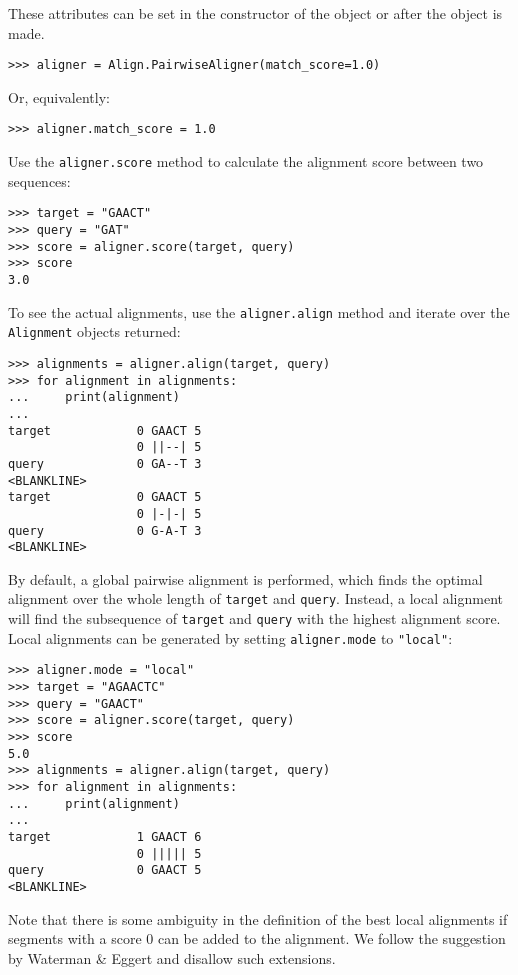 These attributes can be set in the constructor of the object or after the object
is made.

\begin{verbatim}
>>> aligner = Align.PairwiseAligner(match_score=1.0)
\end{verbatim}

Or, equivalently:

\begin{verbatim}
>>> aligner.match_score = 1.0
\end{verbatim}

Use the \verb+aligner.score+ method to calculate the alignment score between
two sequences:

\begin{verbatim}
>>> target = "GAACT"
>>> query = "GAT"
>>> score = aligner.score(target, query)
>>> score
3.0
\end{verbatim}

To see the actual alignments, use the \verb+aligner.align+ method and iterate over the \verb+Alignment+ objects returned:

\begin{verbatim}
>>> alignments = aligner.align(target, query)
>>> for alignment in alignments:
...     print(alignment)
...
target            0 GAACT 5
                  0 ||--| 5
query             0 GA--T 3
<BLANKLINE>
target            0 GAACT 5
                  0 |-|-| 5
query             0 G-A-T 3
<BLANKLINE>
\end{verbatim}

By default, a global pairwise alignment is performed, which finds the optimal
alignment over the whole length of \verb+target+ and \verb+query+.
Instead, a local alignment will find the subsequence of
\verb+target+ and \verb+query+ with the highest alignment score.
Local alignments can be generated by setting \verb+aligner.mode+ to
\verb+"local"+:

\begin{verbatim}
>>> aligner.mode = "local"
>>> target = "AGAACTC"
>>> query = "GAACT"
>>> score = aligner.score(target, query)
>>> score
5.0
>>> alignments = aligner.align(target, query)
>>> for alignment in alignments:
...     print(alignment)
...
target            1 GAACT 6
                  0 ||||| 5
query             0 GAACT 5
<BLANKLINE>
\end{verbatim}

Note that there is some ambiguity in the definition of the best local alignments if segments with a score 0 can be added to the alignment. We follow the suggestion by Waterman \& Eggert \cite{waterman1987} and disallow such extensions.

